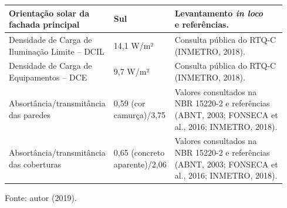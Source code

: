 \begin{table}[ht]
\begin{tabular*}{\columnwidth}{@{\extracolsep{\fill}}lll}
    \makecell[l]{Orientação solar da \\fachada principal}          & Sul                                                                                   & \makecell[l]{Levantamento \textit{in loco}\\ e referências.}                                                                                                             \\ \hline
    \makecell[l]{Densidade de Carga de\\ Iluminação Limite – DCIL} & 14,1 W/m²                                                                             & \makecell[l]{Consulta pública do RTQ-C \\(INMETRO, 2018).}                                                                                                               \\ \hline
    \makecell[l]{Densidade de Carga de\\ Equipamentos – DCE}       & 9,7 W/m²                                                                              & \makecell[l]{Consulta pública do RTQ-C \\(INMETRO, 2018).}                                                                                                               \\ \hline
    \makecell[l]{Absortância/transmitância \\das paredes}          & \makecell[l]{0,59 (cor \\camurça)/3,75}                                               & \makecell[l]{Valores consultados na \\NBR 15220-2 e referências \\(ABNT, 2003; FONSECA et \\al., 2016; INMETRO, 2018).}                                                                     \\ \hline
    \makecell[l]{Absortância/transmitância \\das coberturas}       & \makecell[l]{0,65 (concreto \\aparente)/2,06}                                         & \makecell[l]{Valores consultados na \\NBR 15220-2 e referências \\(ABNT, 2003; FONSECA et \\al., 2016; INMETRO, 2018).}                                                 \\ \hline
    \end{tabular*}
    \begin{flushleft}
        \par \small Fonte: autor (2019).
    \end{flushleft}
\end{table}\vspace*{-0.3cm}

